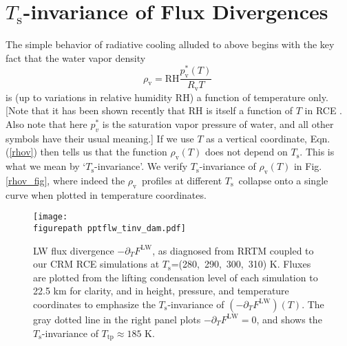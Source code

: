 \documentclass[9pt,twocolumn,twoside,lineno]{pnas-new}
\newcommand{\beqn}{\begin{equation}}
\newcommand{\eeqn}{\end{equation}}
\newcommand{\eqnref}[1]{(\ref{#1})}
\newcommand{\ppt}{\ensuremath{\partial_T}}
\newcommand{\FLW}{\ensuremath{F^\mathrm{LW}}}
\newcommand{\rhov}{\ensuremath{\rho_\mathrm{v}}}
\newcommand{\Rv}{\ensuremath{R_\mathrm{v}}}
\newcommand{\pvstar}{\ensuremath{p^*_{\mathrm{v}}}}
\newcommand{\Ts}{\ensuremath{T_\mathrm{s}}}
\newcommand{\RH}{\ensuremath{\mathrm{RH}}}
\newcommand{\Ttp}{\ensuremath{T_\mathrm{tp}}}
\newcommand{\figurepath}{../../figures/}
\begin{document}
\section{\Ts-invariance of Flux Divergences}
\label{Ts_invariance}
The simple behavior of radiative cooling alluded to above begins with the key fact that  the water vapor density 
	\beqn
		\rhov =  \RH\frac{\pvstar(T)}{\Rv T} \; 
	\label{rhov}
	\eeqn
	 is (up to variations in relative humidity \RH) a function of temperature only. [Note that it has been shown recently that RH is itself a function of $T$ in RCE \cite{romps2014}. Also note that here $p_v^*$  is the saturation vapor pressure of water, and all other symbols have their usual meaning.] If we use $T$ as a vertical coordinate,  Eqn. \eqnref{rhov} then tells us that the function $\rhov(T)$ does not depend on \Ts. This is what we mean by `\Ts-invariance'. We verify \Ts-invariance of $\rhov(T)$  in Fig. \ref{rhov_fig}, where indeed  the \rhov\ profiles at different \Ts\ collapse onto a single curve when plotted in temperature coordinates.


\begin{figure}[t]
	\begin{center}
			\texttt{[image: \\figurepath pptflw\_tinv\_dam.pdf]}
		\caption{LW flux divergence  $-\ppt \FLW$, as diagnosed from RRTM coupled to our CRM RCE simulations at \Ts=(280,\ 290,\ 300,\ 310) K. Fluxes are plotted from the lifting condensation level of each simulation to 22.5 km for clarity, and  in height, pressure, and temperature coordinates to emphasize the \Ts-invariance of  $(-\ppt \FLW)(T)$. The gray dotted line in the right panel plots $-\ppt \FLW = 0$, and shows the \Ts-invariance of $\Ttp \approx 185$ K.
		\label{pptflw_tinv_dam}
		}
	\end{center}
\end{figure}
\end{document}
